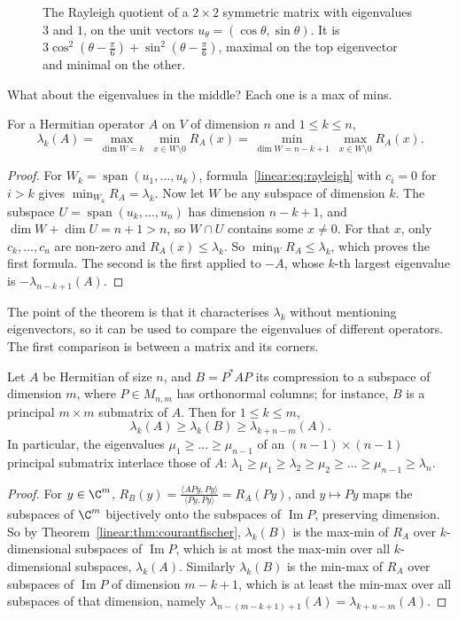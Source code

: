 \begin{figure}[ht]
\centering
{}
\caption{The Rayleigh quotient of a $2\times2$ symmetric matrix with eigenvalues $3$ and $1$, on the unit vectors
$u_\theta=(\cos\theta,\sin\theta)$. It is $3\cos^2(\theta-\frac\pi6)+\sin^2(\theta-\frac\pi6)$, maximal on the top eigenvector
and minimal on the other.}
\label{linear:fig:rayleigh}
\end{figure}

What about the eigenvalues in the middle? Each one is a max of mins.

\begin{theorem}\label{linear:thm:courantfischer}
For a Hermitian operator $A$ on $V$ of dimension $n$ and $1\le k\le n$,
\[
\lambda_k(A)=\max_{\dim W=k}\ \min_{x\in W\setminus0}R_A(x)=\min_{\dim W=n-k+1}\ \max_{x\in W\setminus0}R_A(x).
\]
\end{theorem}
\begin{proof}
For $W_k=\operatorname{span}(u_1,\dots,u_k)$, formula~\eqref{linear:eq:rayleigh} with $c_i=0$ for $i>k$ gives $\min_{W_k}R_A=
\lambda_k$. Now let $W$ be any subspace of dimension $k$. The subspace $U=\operatorname{span}(u_k,\dots,u_n)$ has dimension
$n-k+1$, and $\dim W+\dim U=n+1>n$, so $W\cap U$ contains some $x\ne0$. For that $x$, only $c_k,\dots,c_n$ are non-zero
and $R_A(x)\le\lambda_k$. So $\min_WR_A\le\lambda_k$, which proves the first formula. The second is the first applied to
$-A$, whose $k$-th largest eigenvalue is $-\lambda_{n-k+1}(A)$.
\end{proof}

The point of the theorem is that it characterises $\lambda_k$ without mentioning eigenvectors, so it can be used to compare
the eigenvalues of different operators. The first comparison is between a matrix and its corners.

\begin{theorem}\label{linear:thm:interlacing}
Let $A$ be Hermitian of size $n$, and $B=P^*AP$ its compression to a subspace of dimension $m$, where $P\in M_{n,m}$ has
orthonormal columns; for instance, $B$ is a principal $m\times m$ submatrix of $A$. Then for $1\le k\le m$,
\[
\lambda_k(A)\ge\lambda_k(B)\ge\lambda_{k+n-m}(A).
\]
In particular, the eigenvalues $\mu_1\ge\dots\ge\mu_{n-1}$ of an $(n-1)\times(n-1)$ principal submatrix interlace those of
$A$: $\lambda_1\ge\mu_1\ge\lambda_2\ge\mu_2\ge\dots\ge\mu_{n-1}\ge\lambda_n$.
\end{theorem}
\begin{proof}
For $y\in\C^m$, $R_B(y)=\frac{\langle APy,Py\rangle}{\langle Py,Py\rangle}=R_A(Py)$, and $y\mapsto Py$ maps the subspaces of
$\C^m$ bijectively onto the subspaces of $\operatorname{Im}P$, preserving dimension. So by Theorem~\ref{linear:thm:courantfischer},
$\lambda_k(B)$ is the max-min of $R_A$ over $k$-dimensional subspaces of $\operatorname{Im}P$, which is at most the
max-min over all $k$-dimensional subspaces, $\lambda_k(A)$. Similarly $\lambda_k(B)$ is the min-max of $R_A$ over subspaces
of $\operatorname{Im}P$ of dimension $m-k+1$, which is at least the min-max over all subspaces of that dimension, namely
$\lambda_{n-(m-k+1)+1}(A)=\lambda_{k+n-m}(A)$.
\end{proof}

